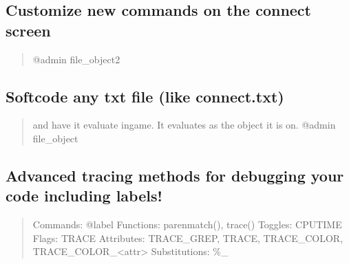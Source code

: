 \documentclass[letterpaper,10pt,english]{sphinxmanual}
\begin{document}
\subsection{Customize new commands on the connect screen}
\label{\detokenize{features:customize-new-commands-on-the-connect-screen}}\begin{quote}

\sphinxAtStartPar
@admin file\_object2
\end{quote}


\subsection{Softcode any txt file (like connect.txt)}
\label{\detokenize{features:softcode-any-txt-file-like-connect-txt}}\begin{quote}

\sphinxAtStartPar
and have it evaluate in\sphinxhyphen{}game.  It evaluates as the object
it is on.
@admin file\_object
\end{quote}


\subsection{Advanced tracing methods for debugging your code including labels!}
\label{\detokenize{features:advanced-tracing-methods-for-debugging-your-code-including-labels}}\begin{quote}

\sphinxAtStartPar
Commands: @label
Functions: parenmatch(), trace()
Toggles: CPUTIME
Flags: TRACE
Attributes: TRACE\_GREP, TRACE, TRACE\_COLOR, TRACE\_COLOR\_\textless{}attr\textgreater{}
Substitutions: \%\_
\end{quote}
\end{document}
